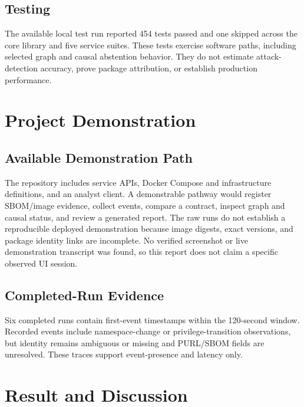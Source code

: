 \documentclass[12pt,a4paper,oneside]{report}
\begin{document}
\section{Testing}
The available local test run reported 454 tests passed and one skipped across the core library and five service suites. These tests exercise software paths, including selected graph and causal abstention behavior. They do not estimate attack-detection accuracy, prove package attribution, or establish production performance.

\chapter{Project Demonstration}
\section{Available Demonstration Path}
The repository includes service APIs, Docker Compose and infrastructure definitions, and an analyst client. A demonstrable pathway would register SBOM/image evidence, collect events, compare a contract, inspect graph and causal status, and review a generated report. The raw runs do not establish a reproducible deployed demonstration because image digests, exact versions, and package identity links are incomplete. No verified screenshot or live demonstration transcript was found, so this report does not claim a specific observed UI session.
\section{Completed-Run Evidence}
Six completed runs contain first-event timestamps within the 120-second window. Recorded events include namespace-change or privilege-transition observations, but identity remains ambiguous or missing and PURL/SBOM fields are unresolved. These traces support event-presence and latency only.

\chapter{Result and Discussion}
\end{document}
